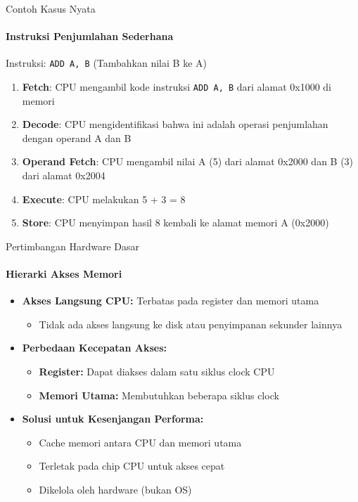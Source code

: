 \documentclass[10pt,aspectratio=169]{beamer}
\begin{document}
\begin{frame}{Contoh Kasus Nyata}
    \framesubtitle{Instruksi Penjumlahan Sederhana}
    
    \begin{center}
        Instruksi: \texttt{ADD A, B} (Tambahkan nilai B ke A)
    \end{center}
    
    \begin{enumerate}
        \item \textbf{Fetch}: CPU mengambil kode instruksi \texttt{ADD A, B} dari alamat 0x1000 di memori
        \item \textbf{Decode}: CPU mengidentifikasi bahwa ini adalah operasi penjumlahan dengan operand A dan B
        \item \textbf{Operand Fetch}: CPU mengambil nilai A (5) dari alamat 0x2000 dan B (3) dari alamat 0x2004
        \item \textbf{Execute}: CPU melakukan 5 + 3 = 8
        \item \textbf{Store}: CPU menyimpan hasil 8 kembali ke alamat memori A (0x2000)
    \end{enumerate}
\end{frame}



\begin{frame}{Pertimbangan Hardware Dasar}
    \framesubtitle{Hierarki Akses Memori}
    \begin{itemize}
        \item \textbf{Akses Langsung CPU:} Terbatas pada register dan memori utama
            \begin{itemize}
                \item Tidak ada akses langsung ke disk atau penyimpanan sekunder lainnya
            \end{itemize}
        \item \textbf{Perbedaan Kecepatan Akses:}
            \begin{itemize}
                \item \textbf{Register:} Dapat diakses dalam satu siklus clock CPU
                \item \textbf{Memori Utama:} Membutuhkan beberapa siklus clock
            \end{itemize}
        \item \textbf{Solusi untuk Kesenjangan Performa:}
            \begin{itemize}
                \item Cache memori antara CPU dan memori utama
                \item Terletak pada chip CPU untuk akses cepat
                \item Dikelola oleh hardware (bukan OS)
            \end{itemize}
    \end{itemize}
\end{frame}
\end{document}
